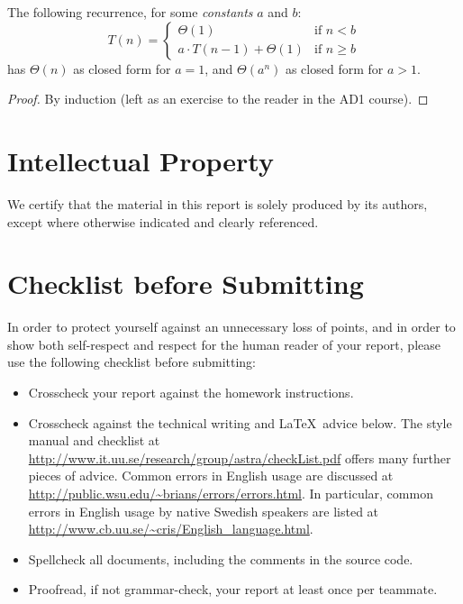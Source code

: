 \documentclass[a4paper,11pt]{article}
\begin{document}
\begin{theorem}
  \label{thm:ind}
  The following recurrence, for some \emph{constants} $a$ and $b$:
  \[
  T(n) =
  \begin{cases}
    \Theta(1) & \text{if~} n < b \\
    a \cdot T(n-1) + \Theta(1) & \text{if~} n \geq b
  \end{cases}
  \]
  has $\Theta(n)$ as closed form for $a = 1$, and $\Theta(a^n)$ as
  closed form for $a > 1$.
\end{theorem}

\begin{proof}
  By induction (left as an exercise to the reader in the AD1 course).
\end{proof}

\section*{Intellectual Property}

We certify that the material in this report is solely produced by its
authors, except where otherwise indicated and clearly referenced.





\newpage
\section*{Checklist before Submitting}

In order to protect yourself against an unnecessary loss of points,
and in order to show both self-respect and respect for the human
reader of your report, please use the following checklist before
submitting:
\begin{itemize}
\item Crosscheck your report against the homework instructions.
\item Crosscheck against the technical writing and \LaTeX\ advice
  below.  The style manual and checklist at
  \url{http://www.it.uu.se/research/group/astra/checkList.pdf} offers
  many further pieces of advice.  Common errors in English usage are
  discussed at \url{http://public.wsu.edu/~brians/errors/errors.html}.
  In particular, common errors in English usage by native Swedish
  speakers are listed at
  \url{http://www.cb.uu.se/~cris/English_language.html}.
\item Spellcheck all documents, including the comments in the source
  code.
\item Proofread, if not grammar-check, your report at least once per
  teammate.
\end{itemize}
\end{document}

